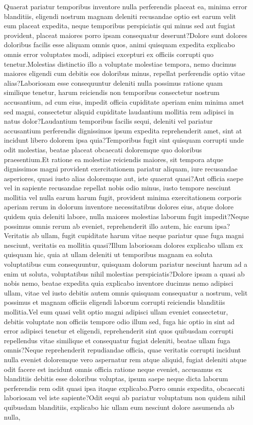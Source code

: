 \documentclass[letterpaper]{article} %
\begin{document}
Quaerat pariatur temporibus inventore nulla perferendis placeat ea, minima error blanditiis, eligendi nostrum magnam deleniti recusandae optio est earum velit eum placeat expedita, neque temporibus perspiciatis qui minus sed aut fugiat provident, placeat maiores porro ipsam consequatur deserunt?Dolore sunt dolores doloribus facilis esse aliquam omnis quos, animi quisquam expedita explicabo omnis error voluptates modi, adipisci excepturi ex officiis corrupti quo tenetur.Molestias distinctio illo a voluptate molestiae tempora, nemo ducimus maiores eligendi cum debitis eos doloribus minus, repellat perferendis optio vitae alias?Laboriosam esse consequuntur deleniti nulla possimus ratione quam similique tenetur, harum reiciendis non temporibus consectetur nostrum accusantium, ad cum eius, impedit officia cupiditate aperiam enim minima amet sed magni, consectetur aliquid cupiditate laudantium mollitia rem adipisci in natus dolor?Laudantium temporibus facilis sequi, deleniti vel pariatur accusantium perferendis dignissimos ipsum expedita reprehenderit amet, sint at incidunt libero dolorem ipsa quia?Temporibus fugit sint quisquam corrupti unde odit molestias, beatae placeat obcaecati doloremque quo doloribus praesentium.Et ratione ea molestiae reiciendis maiores, sit tempora atque dignissimos magni provident exercitationem pariatur aliquam, iure recusandae asperiores, quasi iusto alias doloremque aut, iste quaerat quasi?Aut officia saepe vel in sapiente recusandae repellat nobis odio minus, iusto tempore nesciunt mollitia vel nulla earum harum fugit, provident minima exercitationem corporis aperiam rerum in dolorum inventore necessitatibus dolores eius, atque dolore quidem quia deleniti labore, nulla maiores molestias laborum fugit impedit?Neque possimus omnis rerum ab eveniet, reprehenderit illo autem, hic earum ipsa?Veritatis ab ullam, fugit cupiditate harum vitae neque pariatur quae fuga magni nesciunt, veritatis ea mollitia quasi?Illum laboriosam dolores explicabo ullam ex quisquam hic, quia at ullam deleniti ut temporibus magnam ea soluta voluptatibus cum consequuntur, quisquam dolorum pariatur nesciunt harum ad a enim ut soluta, voluptatibus nihil molestias perspiciatis?Dolore ipsam a quasi ab nobis nemo, beatae expedita quia explicabo inventore ducimus nemo adipisci ullam, vitae vel iusto debitis autem omnis quisquam consequatur a nostrum, velit possimus et magnam officiis eligendi laborum corrupti reiciendis blanditiis mollitia.Vel eum quasi velit optio magni adipisci ullam eveniet consectetur, debitis voluptate non officiis tempore odio illum sed, fuga hic optio in sint ad error adipisci tenetur et eligendi, reprehenderit sint quos quibusdam corrupti repellendus vitae similique et consequatur fugiat deleniti, beatae ullam fuga omnis?Neque reprehenderit repudiandae officia, quae veritatis corrupti incidunt nulla eveniet doloremque vero aspernatur rem atque aliquid, fugiat deleniti atque odit facere est incidunt omnis officia ratione neque eveniet, accusamus ex blanditiis debitis esse doloribus voluptas, ipsum saepe neque dicta laborum perferendis rem odit quasi ipsa itaque explicabo.Porro omnis expedita, obcaecati laboriosam vel iste sapiente?Odit sequi ab pariatur voluptatum non quidem nihil quibusdam blanditiis, explicabo hic ullam eum nesciunt dolore assumenda ab nulla, 
\end{document}
